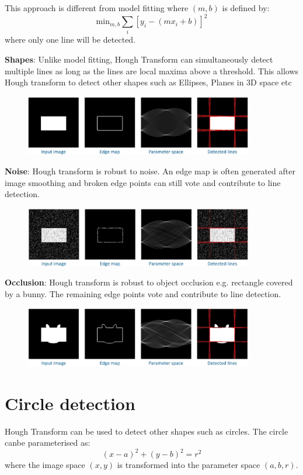 \documentclass{report}
\begin{document}
This approach is different from model fitting where $(m,b)$ is defined by:
$$
    \text{min}_{m,b} \sum_i [y_i - (mx_i + b)]^2
$$
where only one line will be detected. 

\textbf{Shapes}: Unlike model fitting, Hough Transform can simultaneously detect multiple lines
as long as the lines are local maxima above a threshold. This allows Hough
transform to detect other shapes such as Ellipses, Planes in 3D space etc
\begin{figure}[h]
    \centering
    \includegraphics[width=10cm]{Hough ex1.JPG}
\end{figure}

\textbf{Noise}: Hough transform is robust to noise. An edge map is often generated after image
smoothing and broken edge points can still vote and contribute to line detection.
\begin{figure}[h]
    \centering
    \includegraphics[width=10cm]{Hough ex2.JPG}
\end{figure}

\textbf{Occlusion}: Hough transform is robust to object occlusion e.g. rectangle
covered by a bunny. The remaining edge points vote and contribute to line
detection. 
\begin{figure}[h]
    \centering
    \includegraphics[width=10cm]{Hough ex3.JPG}
\end{figure}

\section{Circle detection}

Hough Transform can be used to detect other shapes such as circles. The circle
canbe parameterised as:
$$
    (x-a)^2 + (y-b)^2 = r^2
$$
where the image space $(x,y)$ is transformed into the parameter space $(a,b,r)$. 
\end{document}
